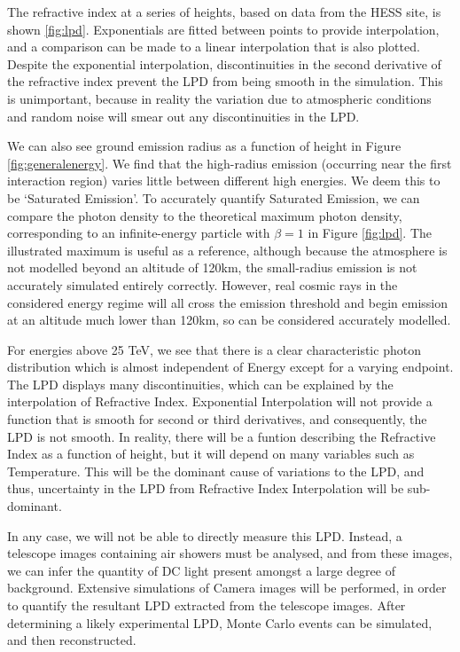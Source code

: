 \documentclass[11pt]{article}
\begin{document}
The refractive index at a series of heights, based on data from the HESS site, is shown \ref{fig:lpd}. Exponentials are fitted between points to provide interpolation, and a comparison can be made to a linear interpolation that is also plotted. Despite the exponential interpolation, discontinuities in the second derivative of the refractive index prevent the LPD from being smooth in the simulation. This is unimportant, because in reality the variation due to atmospheric conditions and random noise will smear out any discontinuities in the LPD.

We can also see ground emission radius as a function of height in Figure \ref{fig:generalenergy}. We find that the high-radius emission (occurring near the first interaction region) varies little between different high energies. We deem this to be \textquoteleft Saturated Emission\textquoteright. To accurately quantify Saturated Emission, we can compare the photon density to the theoretical maximum photon density, corresponding to an infinite-energy particle with $\beta =1$ in Figure \ref{fig:lpd}. The illustrated maximum is useful as a reference, although because the atmosphere is not modelled beyond an altitude of 120km, the small-radius emission is not accurately simulated entirely correctly. However, real cosmic rays in the considered energy regime will all cross the emission threshold and begin emission at an altitude much lower than 120km, so can be considered accurately modelled.

For energies above 25 TeV, we see that there is a clear characteristic photon distribution which is almost independent of Energy except for a varying endpoint. The LPD displays many discontinuities, which can be explained by the interpolation of Refractive Index. Exponential Interpolation will not provide a function that is smooth for second or third derivatives, and consequently, the LPD is not smooth. In reality, there will be a funtion describing the Refractive Index as a function of height, but it will depend on many variables such as Temperature. This will be the dominant cause of variations to the LPD, and thus, uncertainty in the LPD from Refractive Index Interpolation will be sub-dominant.

In any case, we will not be able to directly measure this LPD. Instead, a telescope images containing air showers must be analysed, and from these images, we can infer the quantity of DC light present amongst a large degree of background. Extensive simulations of Camera images will be performed, in order to quantify the resultant LPD extracted from the telescope images. After determining a likely experimental LPD, Monte Carlo events can be simulated, and then reconstructed. 
\end{document}
